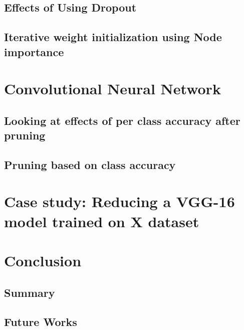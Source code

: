 \documentclass[UKenglish]{ifimaster}
\begin{document}
    \section{Effects of Using Dropout}


    \section{Iterative weight initialization using Node importance}



\chapter{Convolutional Neural Network}
    \section{Looking at effects of per class accuracy after pruning}


    \section{Pruning based on class accuracy}


\chapter{Case study: Reducing a VGG-16 model trained on X dataset}

\chapter{Conclusion}
    \section{Summary}


    \section{Future Works}


\backmatter{}
\printbibliography
\end{document}
